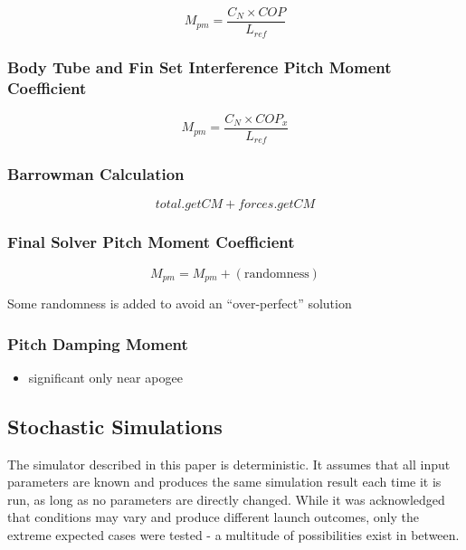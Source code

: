 \documentclass[]{article}
\providecommand{\tightlist}{%
  \setlength{\itemsep}{0pt}\setlength{\parskip}{0pt}}
\begin{document}
\begin{equation}
M_{pm} = \dfrac{C_N \times COP}{L_{ref}}
\end{equation}

\subsubsection{Body Tube and Fin Set Interference Pitch Moment
Coefficient}\label{body-tube-and-fin-set-interference-pitch-moment-coefficient}

\begin{equation}
M_{pm} = \dfrac{C_N \times COP_x}{L_{ref}}
\end{equation}

\subsubsection{Barrowman Calculation}\label{barrowman-calculation}

\begin{equation}
total.getCM + forces.getCM
\end{equation}

\subsubsection{Final Solver Pitch Moment
Coefficient}\label{final-solver-pitch-moment-coefficient}

\begin{equation}
M_{pm} = M_{pm} + \left( \text{randomness}  \right)
\end{equation}

Some randomness is added to avoid an ``over-perfect'' solution

\subsubsection{Pitch Damping Moment}\label{pitch-damping-moment-1}

\begin{itemize}
\tightlist
\item
  significant only near apogee
\end{itemize}

\subsection{Stochastic Simulations}\label{stochastic-simulations}

The simulator described in this paper is deterministic. It assumes that
all input parameters are known and produces the same simulation result
each time it is run, as long as no parameters are directly changed.
While it was acknowledged that conditions may vary and produce different
launch outcomes, only the extreme expected cases were tested - a
multitude of possibilities exist in between.
\end{document}
